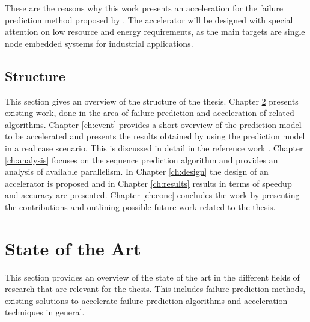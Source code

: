 \documentclass[mscthesis]{usiinfthesis}
\begin{document}
These are the reasons why this work presents an acceleration for the failure
prediction method proposed by \cite{salfner08}. The accelerator will be designed
with special attention on low resource and energy requirements, as the main
targets are single node embedded systems for industrial applications.

\section{Structure}
\label{ch:intro_struct}

This section gives an overview of the structure of the thesis. Chapter
\ref{ch:art} presents existing work, done in the area of failure prediction and
acceleration of related algorithms. Chapter \ref{ch:event} provides a short
overview of the prediction model to be accelerated and presents the results
obtained by using the prediction model in a real case scenario. This is
discussed in detail in the reference work \cite{salfner08}. Chapter
\ref{ch:analysis} focuses on the sequence prediction algorithm and provides an
analysis of available parallelism. In Chapter \ref{ch:design} the design of an
accelerator is proposed and in Chapter \ref{ch:results} results in terms of
speedup and accuracy are presented. Chapter \ref{ch:conc} concludes the work
by presenting the contributions and outlining possible future work related to
the thesis.

\chapter{State of the Art}
\label{ch:art}
\glsresetall %

This section provides an overview of the state of the art in the different
fields of research that are relevant for the thesis. This includes failure
prediction methods, existing solutions to accelerate failure prediction
algorithms and acceleration techniques in general.

\end{document}
